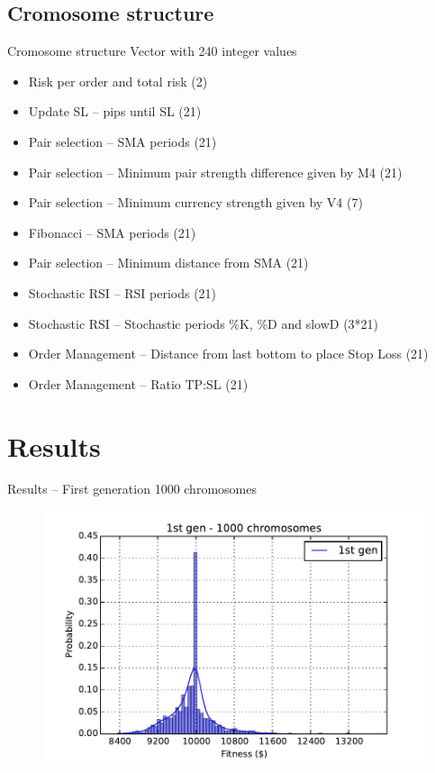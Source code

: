 \documentclass[12pt,portuguese]{beamer}
\begin{document}
\subsection{Cromosome structure}
\begin{frame}{Cromosome structure}
	Vector with 240 integer values
	\begin{itemize}
		\item Risk per order and total risk (2)
		\item Update SL -- pips until SL (21)
		\item Pair selection -- SMA periods (21)
		\item Pair selection -- Minimum pair strength difference given by M4 (21)
		\item Pair selection -- Minimum currency strength given by V4 (7)
		\item Fibonacci -- SMA periods (21)
		\item Pair selection -- Minimum distance from SMA (21)
		\item Stochastic RSI -- RSI periods (21)
		\item Stochastic RSI -- Stochastic periods \%K, \%D and slowD (3*21)
		\item Order Management -- Distance from last bottom to place Stop Loss (21)
		\item Order Management -- Ratio TP:SL (21)
	\end{itemize}
\end{frame}

\section{Results}
\begin{frame}{Results -- First generation 1000 chromosomes}
	\begin{figure}[h]
	\centering
	\includegraphics[width=0.9\columnwidth]{images/01r_1000.pdf}
	\end{figure}
\end{frame}
\end{document}
